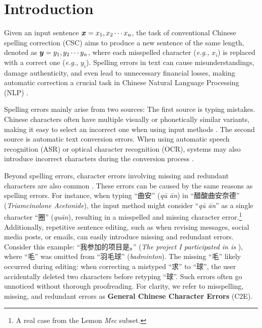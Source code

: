 \section{Introduction}
Given an input sentence ${\boldsymbol{x}} = x_1, x_2 \cdots x_n$, the task of conventional Chinese spelling correction (CSC) aims to produce a new sentence of the same length, denoted as ${\boldsymbol{y}} = y_1, y_2 \cdots y_n$, where each misspelled character (\textit{e.g.,} $x_i$) is replaced with a correct one (\textit{e.g.,} $y_i$).
Spelling errors in text can cause misunderstandings, damage authenticity, and even lead to unnecessary financial losses, making automatic correction a crucial task in Chinese Natural Language Processing (NLP) \cite{wu-etal-2023-rethinking,zhou-etal-2024-simple,li-etal-2024-cllm,dong-etal-2024-rich,liu-etal-2024-arm}.

Spelling errors mainly arise from two sources:
The first source is typing mistakes.
Chinese characters often have multiple visually or phonetically similar variants, making it easy to select an incorrect one when using input methods \cite{hu-etal-2024-cscd}.
The second source is automatic text conversion errors.
When using automatic speech recognition (ASR) or optical character recognition (OCR), systems may also introduce incorrect characters during the conversion process \cite{wang-etal-2018-hybrid}.


Beyond spelling errors, character errors involving missing and redundant characters are also common \cite{he-etal-2023-umrspell}.
These errors can be caused by the same reasons as spelling errors.
For instance, when typing ``曲安'' (\textit{qū ān}) in ``醋酸曲安奈德'' (\textit{Triamcinolone Acetonide}), the input method might consider ``\textit{qū ān}'' as a single character ``圈'' (\textit{quān}), resulting in a misspelled and missing character error.\footnote{A real case from the Lemon \textit{Mec} subset.}
Additionally, repetitive sentence editing, such as when revising messages, social media posts, or emails, can easily introduce missing and redundant errors.
Consider this example: ``我参加的项目是。'' (\textit{The project I participated in is }), where ``毛'' was omitted from ``羽毛球'' (\textit{badminton}).
The missing ``毛'' likely occurred during editing: when correcting a mistyped ``求'' to ``球'', the user accidentally deleted two characters before retyping ``球''.
Such errors often go unnoticed without thorough proofreading.
For clarity, we refer to misspelling, missing, and redundant errors as \textbf{General Chinese Character Errors} (C2E).

